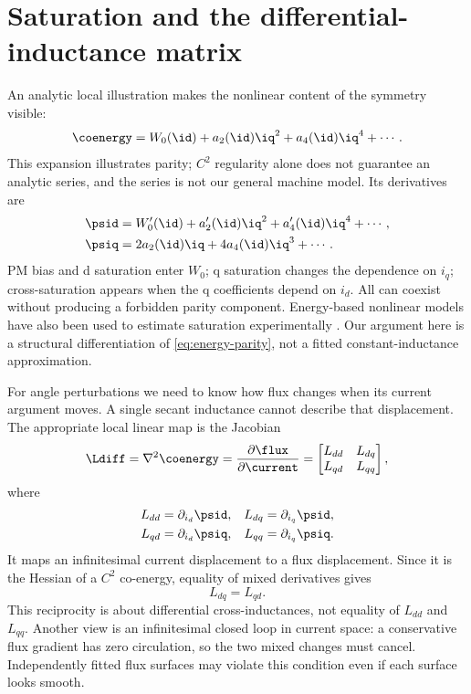 \section{Saturation and the differential-inductance matrix}
An analytic local illustration makes the nonlinear content of the symmetry
visible:
\begin{equation}
 \coenergy=W_0(\id)+a_2(\id)\iq^2+a_4(\id)\iq^4+\cdots.
 \label{eq:local-energy}
\end{equation}
This expansion illustrates parity; $C^2$ regularity alone does not guarantee
an analytic series, and the series is not our general machine model. Its
derivatives are
\begin{align}
 \psid&=W_0'(\id)+a_2'(\id)\iq^2+a_4'(\id)\iq^4+\cdots,\\
 \psiq&=2a_2(\id)\iq+4a_4(\id)\iq^3+\cdots.
\end{align}
PM bias and d saturation enter $W_0$; q saturation changes the dependence on
$i_q$; cross-saturation appears when the q coefficients depend on $i_d$.
All can coexist without producing a forbidden parity component. Energy-based
nonlinear models have also been used to estimate saturation experimentally
\cite{jebai2011}. Our argument here is a structural differentiation of
\cref{eq:energy-parity}, not a fitted constant-inductance approximation.

For angle perturbations we need to know how flux changes when its current
argument moves. A single secant inductance cannot describe that displacement.
The appropriate local linear map is the Jacobian
\begin{equation}
 \Ldiff=\nabla^2\coenergy=\frac{\partial\flux}{\partial\current}
 =\begin{bmatrix}L_{dd}&L_{dq}\\L_{qd}&L_{qq}\end{bmatrix},
 \label{eq:jacobian}
\end{equation}
where
\begin{align}
 L_{dd}&=\partial_{i_d}\psid,&L_{dq}&=\partial_{i_q}\psid,\\
 L_{qd}&=\partial_{i_d}\psiq,&L_{qq}&=\partial_{i_q}\psiq.
\end{align}
It maps an infinitesimal current displacement to a flux displacement. Since
it is the Hessian of a $C^2$ co-energy, equality of mixed derivatives gives
\begin{equation}
 \boxed{L_{dq}=L_{qd}.}\label{eq:reciprocity}
\end{equation}
This reciprocity is about differential cross-inductances, not equality of
$L_{dd}$ and $L_{qq}$. Another view is an infinitesimal closed loop in current
space: a conservative flux gradient has zero circulation, so the two mixed
changes must cancel. Independently fitted flux surfaces may violate this
condition even if each surface looks smooth.

